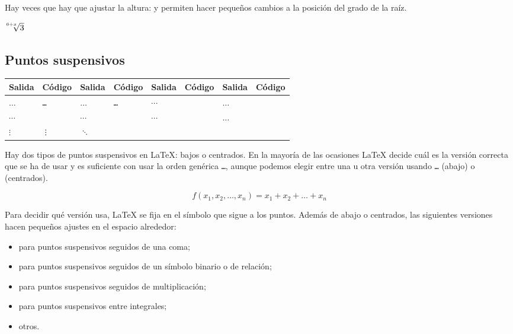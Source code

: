 \documentclass{article}
\numberwithin{equation}{section}
\theoremstyle{plain}
\theoremstyle{definition}
\theoremstyle{remark}
\def\X#1{$#1$ & \texttt{#1}} %
\begin{document}
Hay veces que hay que ajustar la altura: \texttt{} y \texttt{} permiten hacer pequeños cambios a la posición del grado de la raíz.
\begin{codigo-lado}
	$\sqrt[\leftroot{2} \uproot{2} 6+x]{3}$	
\end{codigo-lado}


\subsection{Puntos suspensivos}

\begin{table}[H]
\centering
\begin{tabular}{@{}*8l@{}}
\toprule
Salida & Código & Salida & Código & Salida & Código & Salida & Código \\
\midrule
\X\dots & \X\ldots & \X\cdots & \X\dotsc \\
\X\dotsb & \X\dotsm & \X\dotsi & \X\dotso \\
\X\vdots & \X\ddots & & \\
\bottomrule
\end{tabular}
\end{table}

Hay dos tipos de puntos suspensivos en \LaTeX: bajos o centrados. En la mayoría de las ocasiones \LaTeX{} decide cuál es la versión correcta que se ha de usar y es suficiente con usar la orden genérica \texttt{\dots}, aunque podemos elegir entre una u otra versión usando \texttt{\ldots} (abajo) o \texttt{\cdots} (centrados).
\begin{codigo-arriba}
\[ 
f(x_{1}, x_{2}, \dots, x_{n}) = x_{1} + x_{2} + \dots + x_{n}
\]
\end{codigo-arriba}
Para decidir qué versión usa, \LaTeX{} se fija en el símbolo que sigue a los puntos. Además de abajo o centrados, las siguientes versiones hacen pequeños ajustes en el espacio alrededor:
\begin{itemize}
	\item \texttt{\dotsc} para puntos suspensivos seguidos de una coma; 
	\item \texttt{\dotsb} para puntos suspensivos seguidos de un símbolo binario o de relación;
	\item \texttt{\dotsm} para puntos suspensivos seguidos de multiplicación;
	\item \texttt{\dotsi} para puntos suspensivos entre integrales;
	\item \texttt{\dotso} otros.
\end{itemize}
\end{document}
